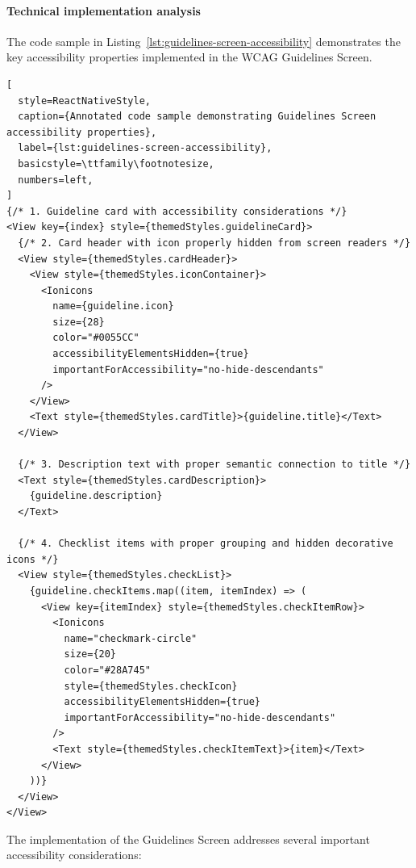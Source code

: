 \paragraph{Technical implementation analysis}

The code sample in Listing~\ref{lst:guidelines-screen-accessibility} demonstrates the key accessibility properties implemented in the WCAG Guidelines Screen.

\begin{lstlisting}[
  style=ReactNativeStyle,
  caption={Annotated code sample demonstrating Guidelines Screen accessibility properties},
  label={lst:guidelines-screen-accessibility},
  basicstyle=\ttfamily\footnotesize,
  numbers=left,
]
{/* 1. Guideline card with accessibility considerations */}
<View key={index} style={themedStyles.guidelineCard}>
  {/* 2. Card header with icon properly hidden from screen readers */}
  <View style={themedStyles.cardHeader}>
    <View style={themedStyles.iconContainer}>
      <Ionicons
        name={guideline.icon}
        size={28}
        color="#0055CC"
        accessibilityElementsHidden={true}
        importantForAccessibility="no-hide-descendants"
      />
    </View>
    <Text style={themedStyles.cardTitle}>{guideline.title}</Text>
  </View>

  {/* 3. Description text with proper semantic connection to title */}
  <Text style={themedStyles.cardDescription}>
    {guideline.description}
  </Text>

  {/* 4. Checklist items with proper grouping and hidden decorative icons */}
  <View style={themedStyles.checkList}>
    {guideline.checkItems.map((item, itemIndex) => (
      <View key={itemIndex} style={themedStyles.checkItemRow}>
        <Ionicons
          name="checkmark-circle"
          size={20}
          color="#28A745"
          style={themedStyles.checkIcon}
          accessibilityElementsHidden={true}
          importantForAccessibility="no-hide-descendants"
        />
        <Text style={themedStyles.checkItemText}>{item}</Text>
      </View>
    ))}
  </View>
</View>
\end{lstlisting}

The implementation of the Guidelines Screen addresses several important accessibility considerations:

